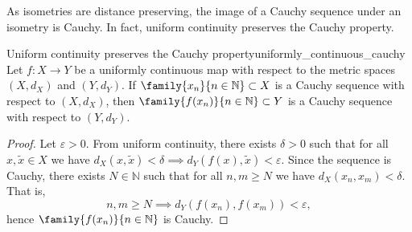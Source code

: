 As isometries are distance preserving, the image of a Cauchy sequence under an isometry is Cauchy. In fact, uniform continuity preserves the Cauchy property.
\begin{proposition}{Uniform continuity preserves the Cauchy property}{uniformly_continuous_cauchy}
    Let \(f : X \to Y\) be a uniformly continuous map with respect to the metric spaces \((X, d_X)\) and \((Y, d_Y)\). If \(\family{x_n}{n\in \mathbb{N}} \subset X\) is a Cauchy sequence with respect to \((X, d_X)\), then \(\family{f(x_n)}{n\in \mathbb{N}} \subset Y\) is a Cauchy sequence with respect to \((Y, d_Y)\).
\end{proposition}
\begin{proof}
    Let \(\varepsilon > 0\). From uniform continuity, there exists \(\delta > 0\) such that for all \(x, \tilde{x} \in X\) we have \(d_X(x, \tilde{x}) < \delta \implies d_Y(f(x), \tilde{x}) < \varepsilon.\) Since the sequence is Cauchy, there exists \(N \in \mathbb{N}\) such that for all \(n, m \geq N\) we have \(d_X(x_n, x_m) < \delta\). That is,
    \begin{equation*}
        n,m\geq N \implies d_Y(f(x_n), f(x_m)) < \varepsilon,
    \end{equation*}
    hence \(\family{f(x_n)}{n\in \mathbb{N}}\) is Cauchy.
\end{proof}

